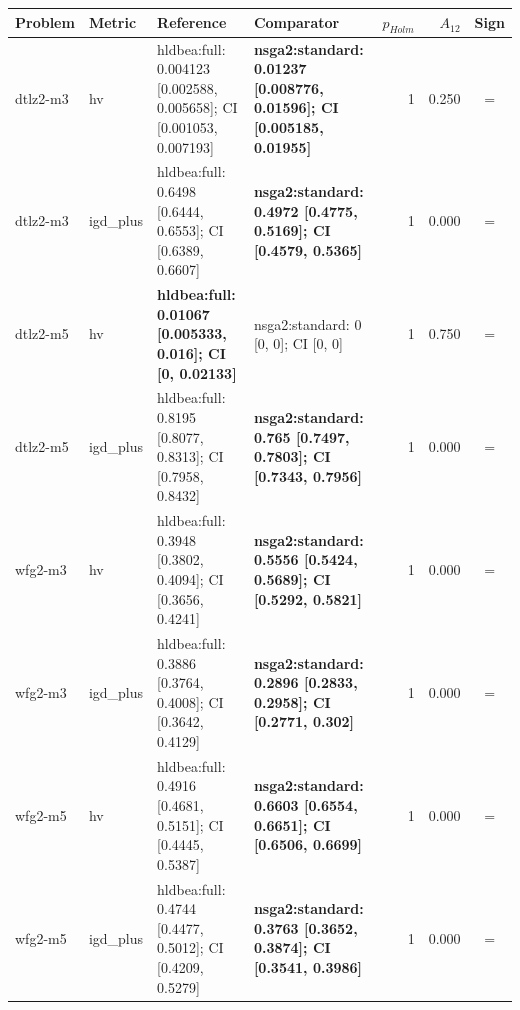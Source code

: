 \begin{tabular}{llllrrc}
\toprule
Problem & Metric & Reference & Comparator & $p_{Holm}$ & $A_{12}$ & Sign \\
\midrule
dtlz2-m3 & hv & hldbea:full: 0.004123 [0.002588, 0.005658]; CI [0.001053, 0.007193] & \textbf{nsga2:standard: 0.01237 [0.008776, 0.01596]; CI [0.005185, 0.01955]} & 1 & 0.250 & = \\
dtlz2-m3 & igd\_plus & hldbea:full: 0.6498 [0.6444, 0.6553]; CI [0.6389, 0.6607] & \textbf{nsga2:standard: 0.4972 [0.4775, 0.5169]; CI [0.4579, 0.5365]} & 1 & 0.000 & = \\
dtlz2-m5 & hv & \textbf{hldbea:full: 0.01067 [0.005333, 0.016]; CI [0, 0.02133]} & nsga2:standard: 0 [0, 0]; CI [0, 0] & 1 & 0.750 & = \\
dtlz2-m5 & igd\_plus & hldbea:full: 0.8195 [0.8077, 0.8313]; CI [0.7958, 0.8432] & \textbf{nsga2:standard: 0.765 [0.7497, 0.7803]; CI [0.7343, 0.7956]} & 1 & 0.000 & = \\
wfg2-m3 & hv & hldbea:full: 0.3948 [0.3802, 0.4094]; CI [0.3656, 0.4241] & \textbf{nsga2:standard: 0.5556 [0.5424, 0.5689]; CI [0.5292, 0.5821]} & 1 & 0.000 & = \\
wfg2-m3 & igd\_plus & hldbea:full: 0.3886 [0.3764, 0.4008]; CI [0.3642, 0.4129] & \textbf{nsga2:standard: 0.2896 [0.2833, 0.2958]; CI [0.2771, 0.302]} & 1 & 0.000 & = \\
wfg2-m5 & hv & hldbea:full: 0.4916 [0.4681, 0.5151]; CI [0.4445, 0.5387] & \textbf{nsga2:standard: 0.6603 [0.6554, 0.6651]; CI [0.6506, 0.6699]} & 1 & 0.000 & = \\
wfg2-m5 & igd\_plus & hldbea:full: 0.4744 [0.4477, 0.5012]; CI [0.4209, 0.5279] & \textbf{nsga2:standard: 0.3763 [0.3652, 0.3874]; CI [0.3541, 0.3986]} & 1 & 0.000 & = \\
\bottomrule
\end{tabular}

